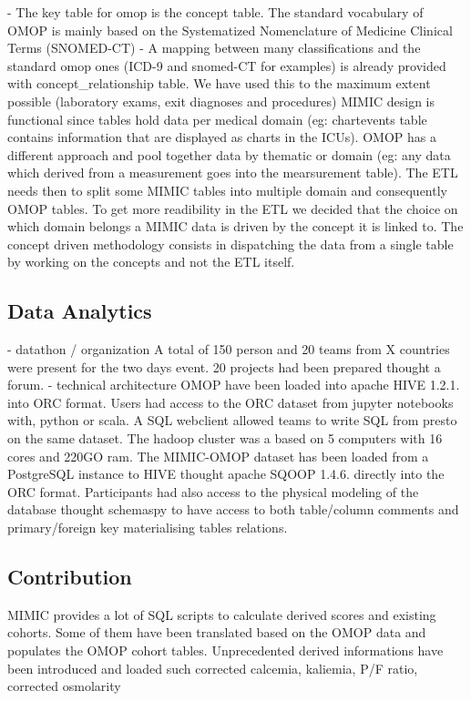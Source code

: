 - The key table for omop is the concept table. The standard vocabulary of OMOP
is mainly based on the Systematized Nomenclature of Medicine Clinical Terms
(SNOMED-CT)
- A mapping between many classifications and the standard omop ones (ICD-9 and
snomed-CT for examples) is already provided with concept\_relationship table. We
have used this to the maximum extent possible (laboratory exams, exit diagnoses
and procedures)
MIMIC design is functional since tables hold data per medical domain (eg:
chartevents table contains information that are displayed as charts in the
ICUs). OMOP has a different approach and pool together data by thematic or
domain (eg: any data which derived from a measurement goes into the
mearsurement table). The ETL needs then to split some MIMIC tables into
multiple domain and consequently OMOP tables. To get more readibility in the
ETL we decided that the choice on which domain belongs a MIMIC data is driven
by the concept it is linked to. The concept driven methodology consists in
dispatching the data from a single table by working on the concepts and not the
ETL itself.

\subsection{Data Analytics}
- datathon / organization
A total of 150 person and 20 teams from X countries were present for the two
days event. 20 projects had been prepared thought a forum.
- technical architecture
OMOP have been loaded into apache HIVE 1.2.1. into ORC format. Users had access
to the ORC dataset from jupyter notebooks with, python or scala. A SQL
webclient allowed teams to write SQL from presto on the same dataset. The
hadoop cluster was a based on 5 computers with 16 cores and 220GO ram.
The MIMIC-OMOP dataset has been loaded from a PostgreSQL instance to HIVE
thought apache SQOOP 1.4.6. directly into the ORC format. 
Participants had also access to the physical modeling of the database thought
schemaspy to have access to both table/column comments and primary/foreign key
materialising tables relations.
\subsection{Contribution}
MIMIC provides a lot of SQL scripts to calculate derived scores and existing
cohorts. Some of them have been translated based on the OMOP data and
populates the OMOP cohort tables.
Unprecedented derived informations have been introduced and loaded such
corrected calcemia, kaliemia, P/F ratio, corrected osmolarity

